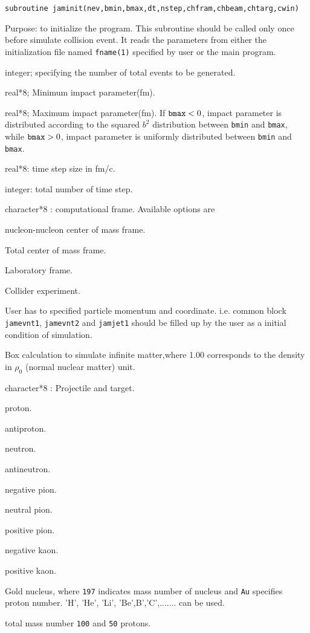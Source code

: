 \documentclass[]{article}
\newenvironment{entry}%
{\begin{list}{}{\setlength{\topsep}{0mm} \setlength{\itemsep}{0mm}
\setlength{\parskip}{0mm} \setlength{\parsep}{0mm}
\setlength{\leftmargin}{20mm} \setlength{\rightmargin}{0mm}
\setlength{\labelwidth}{18mm} \setlength{\labelsep}{2mm}}}%
{\end{list}}
\newenvironment{subentry}%
{\begin{list}{}{\setlength{\topsep}{0mm} \setlength{\itemsep}{0mm}
\setlength{\parskip}{0mm} \setlength{\parsep}{0mm}
\setlength{\leftmargin}{10mm} \setlength{\rightmargin}{0mm}
\setlength{\labelwidth}{18mm} \setlength{\labelsep}{2mm}}}%
{\end{list}}
\newcommand{\ttt}[1]{{\tt#1}}
\newcommand{\itemt}[1]{\item[{\tt #1}\hfill]}
\newcommand{\iteme}[1]{\item[{\tt #1}]}
\begin{document}
\begin{verbatim}
subroutine jaminit(nev,bmin,bmax,dt,nstep,chfram,chbeam,chtarg,cwin)
\end{verbatim}
Purpose: to initialize the program.
This subroutine should be called only once before simulate collision event.
 It reads the parameters
from either the initialization file named {\tt fname(1)} specified by user
or the main program.
\medskip

\begin{entry}
\iteme{nev:} integer; specifying the number of total events
  to be generated.
\iteme{bmin:} real*8; Minimum impact parameter(fm).
\iteme{bmax:} real*8; Maximum impact parameter(fm).
If ${\tt bmax}<0$, impact parameter is distributed
      according to the squared $b^2$ distribution
       between {\tt bmin} and {\tt bmax},
     while ${\tt bmax}>0$, impact parameter is uniformly distributed
     between {\tt bmin} and {\tt bmax}.

\iteme{dt:} real*8: time step size in fm/c.

\iteme{nstep:} integer: total number of time step.

\iteme{chfram:} character*8 : computational frame. Available options are
  \begin{subentry}
    \iteme{'nn':}        nucleon-nucleon center of mass frame.
    \iteme{'cm':}        Total center of mass frame.
    \iteme{'lab':}       Laboratory frame.
    \iteme{'collider':} Collider experiment.
    \iteme{'user':}   User has to specified particle momentum and
                     coordinate. i.e.  common block \ttt{jamevnt1},
                      \ttt{jamevnt2} and \ttt{jamjet1}
                     should be filled up by the user as a initial condition
                     of simulation.
    \iteme{'box1.00':} Box calculation to simulate infinite matter,where
                       1.00 corresponds to the density in
                        $\rho_{0}$ (normal nuclear matter) unit.
  \end{subentry}

\iteme{chbeam, chtarg:} character*8 : Projectile and target.
 \begin{subentry}
  \iteme{'p':}     proton.
  \iteme{'pbar':}  antiproton.
  \iteme{'n':}     neutron.
  \iteme{'nbar':}  antineutron.
  \iteme{'pi-':}   negative pion.
  \iteme{'pi0':}   neutral pion.
  \iteme{'pi+':}   positive pion.
  \iteme{'k-':}    negative kaon.
  \iteme{'k+':}    positive kaon.
  \iteme{'197Au'}  Gold nucleus,
         where \ttt{197} indicates mass number of nucleus
         and {\tt Au} specifies proton number.
          'H', 'He', 'Li', 'Be',B','C',....... can be used.
  \itemt{\tt '100:50'} total mass number \ttt{100} and \ttt{50} protons.
 \end{subentry}


\end{entry}
\end{document}
